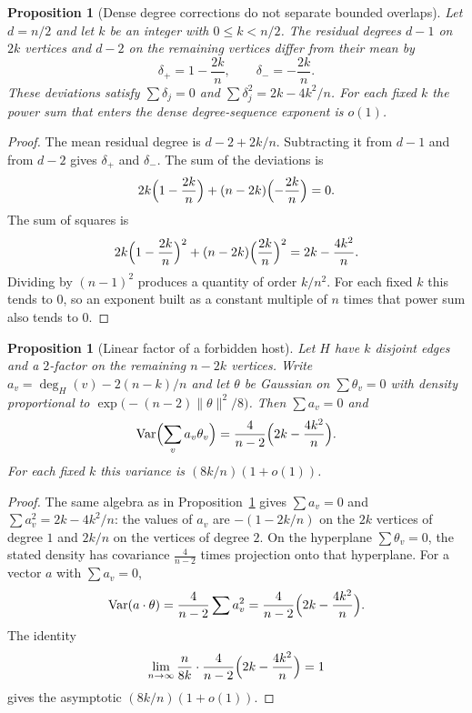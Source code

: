 \documentclass[11pt]{article}
\newtheorem{proposition}[theorem]{Proposition}
\newcommand{\Var}{\mathrm{Var}}
\begin{document}
\begin{proposition}[Dense degree corrections do not separate bounded overlaps]
\label{prop:gamma-flat}
Let \(d=n/2\) and let \(k\) be an integer with \(0\le k<n/2\).
The residual degrees \(d-1\) on \(2k\) vertices and \(d-2\) on the remaining vertices
differ from their mean by
\[
\delta_+=1-\frac{2k}{n},\qquad \delta_-=-\frac{2k}{n}.
\]
These deviations satisfy \(\sum\delta_j=0\) and \(\sum\delta_j^2=2k-4k^2/n\).
For each fixed \(k\) the power sum that enters the dense degree-sequence exponent is \(o(1)\).
\end{proposition}

\begin{proof}
The mean residual degree is \(d-2+2k/n\). Subtracting it from \(d-1\) and from \(d-2\)
gives \(\delta_+\) and \(\delta_-\). The sum of the deviations is
\[
2k\Bigl(1-\frac{2k}{n}\Bigr)+(n-2k)\Bigl(-\frac{2k}{n}\Bigr)=0.
\]
The sum of squares is
\[
2k\Bigl(1-\frac{2k}{n}\Bigr)^2+(n-2k)\Bigl(\frac{2k}{n}\Bigr)^2=2k-\frac{4k^2}{n}.
\]
Dividing by \((n-1)^2\) produces a quantity of order \(k/n^2\). For each fixed \(k\) this tends to \(0\),
so an exponent built as a constant multiple of \(n\) times that power sum also tends to \(0\).
\end{proof}

\begin{proposition}[Linear factor of a forbidden host]
\label{prop:linear-host}
Let \(H\) have \(k\) disjoint edges and a \(2\)-factor on the remaining \(n-2k\) vertices.
Write \(a_v=\deg_H(v)-2(n-k)/n\) and let \(\theta\) be Gaussian on \(\sum\theta_v=0\) with density proportional to
\(\exp\bigl(-(n-2)\|\theta\|^2/8\bigr)\).
Then \(\sum a_v=0\) and
\[
\Var\Bigl(\sum_v a_v\theta_v\Bigr)
=
\frac{4}{n-2}\Bigl(2k-\frac{4k^2}{n}\Bigr).
\]
For each fixed \(k\) this variance is \((8k/n)(1+o(1))\).
\end{proposition}

\begin{proof}
The same algebra as in Proposition~\ref{prop:gamma-flat} gives \(\sum a_v=0\) and
\(\sum a_v^2=2k-4k^2/n\): the values of \(a_v\) are \(-(1-2k/n)\) on the \(2k\) vertices of degree \(1\)
and \(2k/n\) on the vertices of degree \(2\).
On the hyperplane \(\sum\theta_v=0\), the stated density has covariance
\(\frac{4}{n-2}\) times projection onto that hyperplane.
For a vector \(a\) with \(\sum a_v=0\),
\[
\Var(a\cdot\theta)=\frac{4}{n-2}\sum a_v^2
=
\frac{4}{n-2}\Bigl(2k-\frac{4k^2}{n}\Bigr).
\]
The identity
\[
\lim_{n\to\infty}\frac{n}{8k}\cdot\frac{4}{n-2}\Bigl(2k-\frac{4k^2}{n}\Bigr)=1
\]
gives the asymptotic \((8k/n)(1+o(1))\).
\end{proof}
\end{document}
